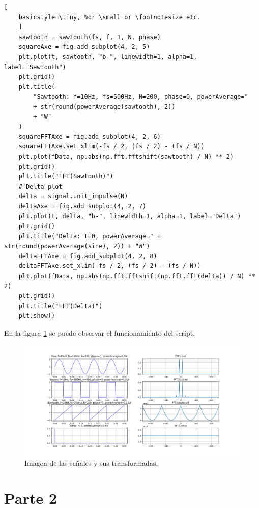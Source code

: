 \documentclass[
    11pt,
    spanish,
	a4paper
]{article}
\begin{document}
\begin{lstlisting}[
    basicstyle=\tiny, %or \small or \footnotesize etc.
    ]
    sawtooth = sawtooth(fs, f, 1, N, phase)
    squareAxe = fig.add_subplot(4, 2, 5)
    plt.plot(t, sawtooth, "b-", linewidth=1, alpha=1, label="Sawtooth")
    plt.grid()
    plt.title(
        "Sawtooth: f=10Hz, fs=500Hz, N=200, phase=0, powerAverage="
        + str(round(powerAverage(sawtooth), 2))
        + "W"
    )
    squareFFTAxe = fig.add_subplot(4, 2, 6)
    squareFFTAxe.set_xlim(-fs / 2, (fs / 2) - (fs / N))
    plt.plot(fData, np.abs(np.fft.fftshift(sawtooth) / N) ** 2)
    plt.grid()
    plt.title("FFT(Sawtooth)")
    # Delta plot
    delta = signal.unit_impulse(N)
    deltaAxe = fig.add_subplot(4, 2, 7)
    plt.plot(t, delta, "b-", linewidth=1, alpha=1, label="Delta")
    plt.grid()
    plt.title("Delta: t=0, powerAverage=" + str(round(powerAverage(sine), 2)) + "W")
    deltaFFTAxe = fig.add_subplot(4, 2, 8)
    deltaFFTAxe.set_xlim(-fs / 2, (fs / 2) - (fs / N))
    plt.plot(fData, np.abs(np.fft.fftshift(np.fft.fft(delta)) / N) ** 2)
    plt.grid()
    plt.title("FFT(Delta)")
    plt.show()
\end{lstlisting}

En la figura \ref{fig:parte1} se puede observar el funcionamiento del script.

\begin{figure}[htbp]
	\centering
	\includegraphics[width=\textwidth]{img/parte1.png}
	\caption{Imagen de las señales y sus transformadas.}
	\label{fig:parte1}
\end{figure}

\section{Parte 2}
\end{document}
